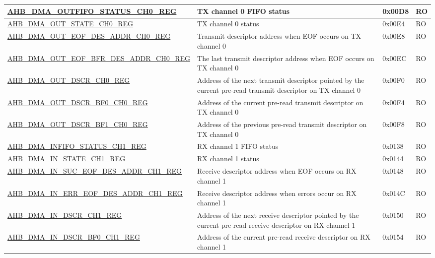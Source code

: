 \begin{longtable}{ | l | p{10cm} | p{1.3cm} | l | }
\hyperref[regdesc:AHBDMAOUTFIFOSTATUSCHNREG]{AHB\_DMA\_OUTFIFO\_STATUS\_CH0\_REG} & TX channel 0 FIFO status & 0x00D8 & RO \\ \hline
\hyperref[regdesc:AHBDMAOUTSTATECHNREG]{AHB\_DMA\_OUT\_STATE\_CH0\_REG} & TX channel 0 status & 0x00E4 & RO \\ \hline
\hyperref[regdesc:AHBDMAOUTEOFDESADDRCHNREG]{AHB\_DMA\_OUT\_EOF\_DES\_ADDR\_CH0\_REG} & Transmit descriptor address when EOF occurs on TX channel 0 & 0x00E8 & RO \\ \hline
\hyperref[regdesc:AHBDMAOUTEOFBFRDESADDRCHNREG]{AHB\_DMA\_OUT\_EOF\_BFR\_DES\_ADDR\_CH0\_REG} & The last transmit descriptor address when EOF occurs on TX channel 0 & 0x00EC & RO \\ \hline
\hyperref[regdesc:AHBDMAOUTDSCRCHNREG]{AHB\_DMA\_OUT\_DSCR\_CH0\_REG} & Address of the next transmit descriptor pointed by the current pre-read transmit descriptor on TX channel 0 & 0x00F0 & RO \\ \hline
\hyperref[regdesc:AHBDMAOUTDSCRBF0CHNREG]{AHB\_DMA\_OUT\_DSCR\_BF0\_CH0\_REG} & Address of the current pre-read transmit descriptor on TX channel 0 & 0x00F4 & RO \\ \hline
\hyperref[regdesc:AHBDMAOUTDSCRBF1CHNREG]{AHB\_DMA\_OUT\_DSCR\_BF1\_CH0\_REG} & Address of the previous pre-read transmit descriptor on TX channel 0 & 0x00F8 & RO \\ \hline
\hyperref[regdesc:AHBDMAINFIFOSTATUSCHNREG]{AHB\_DMA\_INFIFO\_STATUS\_CH1\_REG} & RX channel 1 FIFO status & 0x0138 & RO \\ \hline
\hyperref[regdesc:AHBDMAINSTATECHNREG]{AHB\_DMA\_IN\_STATE\_CH1\_REG} & RX channel 1 status & 0x0144 & RO \\ \hline
\hyperref[regdesc:AHBDMAINSUCEOFDESADDRCHNREG]{AHB\_DMA\_IN\_SUC\_EOF\_DES\_ADDR\_CH1\_REG} & Receive descriptor address when EOF occurs on RX channel 1 & 0x0148 & RO \\ \hline
\hyperref[regdesc:AHBDMAINERREOFDESADDRCHNREG]{AHB\_DMA\_IN\_ERR\_EOF\_DES\_ADDR\_CH1\_REG} & Receive descriptor address when errors occur on RX channel 1 & 0x014C & RO \\ \hline
\hyperref[regdesc:AHBDMAINDSCRCHNREG]{AHB\_DMA\_IN\_DSCR\_CH1\_REG} & Address of the next receive descriptor pointed by the current pre-read receive descriptor on RX channel 1 & 0x0150 & RO \\ \hline
\hyperref[regdesc:AHBDMAINDSCRBF0CHNREG]{AHB\_DMA\_IN\_DSCR\_BF0\_CH1\_REG} & Address of the current pre-read receive descriptor on RX channel 1 & 0x0154 & RO \\ \hline

\end{longtable}
